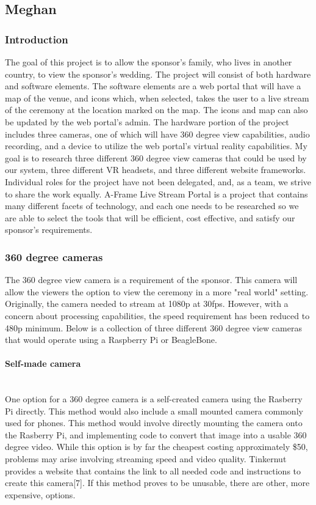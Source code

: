 \documentclass[onecolumn, draftclsnofoot,10pt, compsoc]{IEEEtran}
\begin{document}
    
    \subsection{Meghan}
    \subsubsection{Introduction}
	The goal of this project is to allow the sponsor's family, who lives in another country, to view the sponsor's wedding.
	The project will consist of both hardware and software elements.
	The software elements are a web portal that will have a map of the venue, and icons which, when selected, takes the user to a live stream of the ceremony at the location marked on the map. 
	The icons and map can also be updated by the web portal's admin.
	The hardware portion of the project includes three cameras, one of which will have 360 degree view capabilities, audio recording, and a device to utilize the web portal's virtual reality capabilities.
	My goal is to research three different 360 degree view cameras that could be used by our system, three different VR headsets, and three different website frameworks.
	Individual roles for the project have not been delegated, and, as a team, we strive to share the work equally.
	A-Frame Live Stream Portal is a project that contains many different facets of technology, and each one needs to be researched so we are able to select the tools that will be efficient, cost effective, and satisfy our sponsor's requirements. 
	
    \subsubsection{360 degree cameras}
    The 360 degree view camera is a requirement of the sponsor.
    This camera will allow the viewers the option to view the ceremony in a more "real world" setting.
    Originally, the camera needed to stream at 1080p at 30fps. 
    However, with a concern about processing capabilities, the speed requirement has been reduced to 480p minimum.
    Below is a collection of three different 360 degree view cameras that would operate using a Raspberry Pi or BeagleBone.
    
    \paragraph{Self-made camera} \\
    One option for a 360 degree camera is a self-created camera using the Rasberry Pi directly.
    This method would also include a small mounted camera commonly used for phones.
    This method would involve directly mounting the camera onto the Rasberry Pi, and implementing code to convert that image into a usable 360 degree video.
    While this option is by far the cheapest costing approximately \$50, problems may arise involving streaming speed and video quality.
    Tinkernut provides a website that contains the link to all needed code and instructions to create this camera[7].
    If this method proves to be unusable, there are other, more expensive, options.
\end{document}
